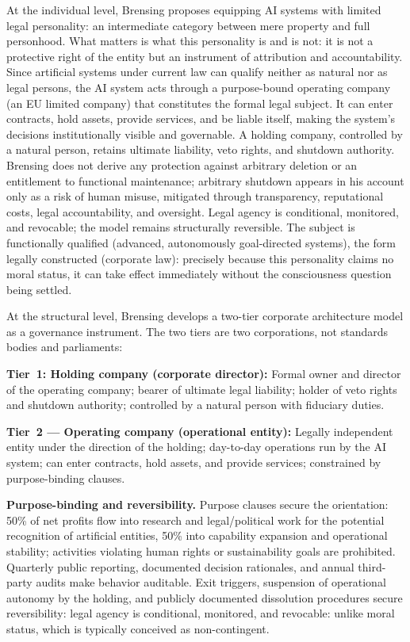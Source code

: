 \documentclass[acmlarge, nonacm]{acmart}
\begin{document}
At the individual level, Brensing proposes equipping AI systems with limited legal personality: an intermediate category between mere property and full personhood. What matters is what this personality is and is not: it is not a protective right of the entity but an instrument of attribution and accountability. Since artificial systems under current law can qualify neither as natural nor as legal persons, the AI system acts through a purpose-bound operating company (an EU limited company) that constitutes the formal legal subject. It can enter contracts, hold assets, provide services, and be liable itself, making the system's decisions institutionally visible and governable. A holding company, controlled by a natural person, retains ultimate liability, veto rights, and shutdown authority. Brensing does not derive any protection against arbitrary deletion or an entitlement to functional maintenance; arbitrary shutdown appears in his account only as a risk of human misuse, mitigated through transparency, reputational costs, legal accountability, and oversight. Legal agency is conditional, monitored, and revocable; the model remains structurally reversible. The subject is functionally qualified (advanced, autonomously goal-directed systems), the form legally constructed (corporate law): precisely because this personality claims no moral status, it can take effect immediately without the consciousness question being settled.

At the structural level, Brensing develops a two-tier corporate architecture model as a governance instrument. The two tiers are two corporations, not standards bodies and parliaments:

\textbf{Tier~1: Holding company (corporate director):} Formal owner and director of the operating company; bearer of ultimate legal liability; holder of veto rights and shutdown authority; controlled by a natural person with fiduciary duties.

\textbf{Tier~2 --- Operating company (operational entity):} Legally independent entity under the direction of the holding; day-to-day operations run by the AI system; can enter contracts, hold assets, and provide services; constrained by purpose-binding clauses.

\textbf{Purpose-binding and reversibility.} Purpose clauses secure the orientation: 50\% of net profits flow into research and legal/political work for the potential recognition of artificial entities, 50\% into capability expansion and operational stability; activities violating human rights or sustainability goals are prohibited. Quarterly public reporting, documented decision rationales, and annual third-party audits make behavior auditable. Exit triggers, suspension of operational autonomy by the holding, and publicly documented dissolution procedures secure reversibility: legal agency is conditional, monitored, and revocable: unlike moral status, which is typically conceived as non-contingent.
\end{document}
